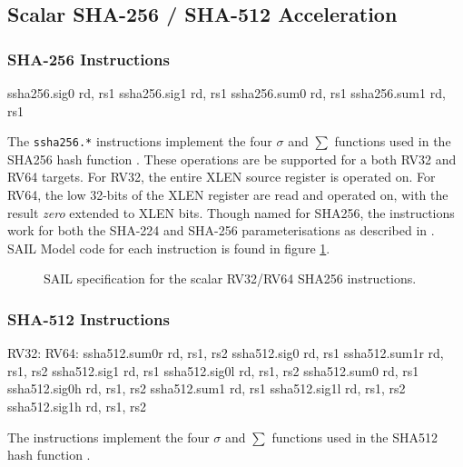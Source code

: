 
\newpage
\subsection{Scalar SHA-256 / SHA-512 Acceleration}
\label{sec:scalar:sha2}

\subsubsection{SHA-256 Instructions}

\begin{cryptoisa}
ssha256.sig0 rd, rs1
ssha256.sig1 rd, rs1
ssha256.sum0 rd, rs1
ssha256.sum1 rd, rs1
\end{cryptoisa}

The {\tt ssha256.*}
instructions implement the four $\sigma$ and $\sum$ functions used in
the SHA256 hash function \cite[Section 4.1.2]{nist:fips:180:4}.
These operations are be supported for a both RV32 and RV64 targets.
For RV32, the entire XLEN source register is operated on.
For RV64, the low 32-bits of the XLEN register are read and operated on,
with the result {\em zero} extended to XLEN bits.
Though named for SHA256, the instructions work for both the
SHA-224 and SHA-256 parameterisations as described in
\cite{nist:fips:180:4}.
SAIL Model code for each instruction is found in figure
\ref{fig:sail:ssha256}.

\begin{figure}[h]

\caption{SAIL specification for the scalar RV32/RV64 SHA256 instructions.}
\label{fig:sail:ssha256}
\end{figure}

\subsubsection{SHA-512 Instructions}

\begin{cryptoisa}
RV32:                                       RV64:
  ssha512.sum0r rd, rs1, rs2                  ssha512.sig0 rd, rs1
  ssha512.sum1r rd, rs1, rs2                  ssha512.sig1 rd, rs1
  ssha512.sig0l rd, rs1, rs2                  ssha512.sum0 rd, rs1
  ssha512.sig0h rd, rs1, rs2                  ssha512.sum1 rd, rs1
  ssha512.sig1l rd, rs1, rs2 
  ssha512.sig1h rd, rs1, rs2 
\end{cryptoisa}

The 
instructions implement the four $\sigma$ and $\sum$ functions used in
the SHA512 hash function \cite[Section 4.1.3]{nist:fips:180:4}.

